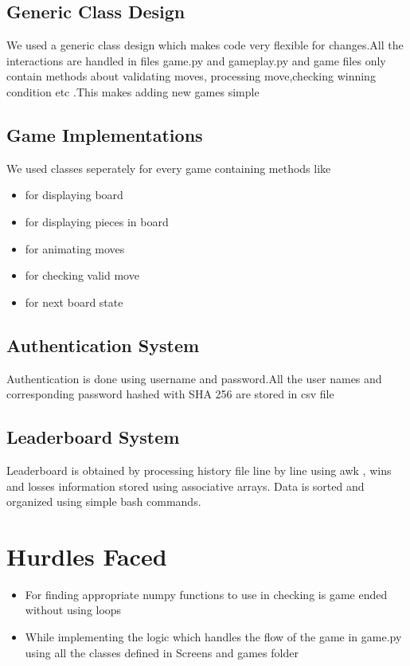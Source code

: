 \documentclass[12pt]{article}
\begin{document}
\subsection{Generic Class Design}
We used a generic class design which makes code very flexible for changes.All the interactions are handled in files game.py and gameplay.py and game files only contain methods about validating moves, processing move,checking winning condition etc .This makes adding new games simple



\subsection{Game Implementations}
We used classes seperately for every game containing methods like
\begin{itemize}
    \item for displaying board
    \item for displaying pieces in board
    \item for animating moves
    \item for checking valid move
    \item for next board state
\end{itemize}

\subsection{Authentication System}
Authentication is done using username and password.All the user names and corresponding password hashed with SHA 256 are stored in csv file

\subsection{Leaderboard System}
Leaderboard is obtained by processing history file line by line using awk , wins and losses information stored using associative arrays. Data is sorted and organized using simple bash commands.

\section{Hurdles Faced}
\begin{itemize}
    \item For finding appropriate numpy functions to use in checking is game ended without using loops
    \item While implementing the logic which handles the flow of the game in game.py using all the classes defined in Screens and games folder
\end{itemize}
\end{document}
